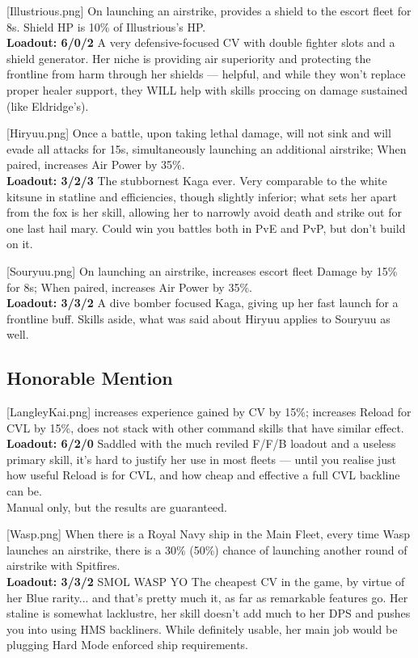 [Illustrious.png]
{On launching an airstrike, provides a shield to the escort fleet for 8s. Shield HP is 10\% of Illustrious's HP.\\
\textbf{Loadout: 6/0/2}}
{}
{A very defensive-focused CV with double fighter slots and a shield generator. Her niche is providing air superiority and protecting the frontline from harm through her shields --- helpful, and while they won't replace proper healer support, they WILL help with skills proccing on damage sustained (like Eldridge's).}
 
[Hiryuu.png]
{Once a battle, upon taking lethal damage, will not sink and will evade all attacks for 15s, simultaneously launching an additional airstrike; When paired, increases Air Power by 35\%.\\
\textbf{Loadout: 3/2/3}}
{}
{The stubbornest Kaga ever. Very comparable to the white kitsune in statline and efficiencies, though slightly inferior; what sets her apart from the fox is her skill, allowing her to narrowly avoid death and strike out for one last hail mary. Could win you battles both in PvE and PvP, but don't build on it.}

[Souryuu.png]
{On launching an airstrike, increases escort fleet Damage by 15\% for 8s; When paired, increases Air Power by 35\%.\\
\textbf{Loadout: 3/3/2}}
{}
{A dive bomber focused Kaga, giving up her fast launch for a frontline buff. Skills aside, what was said about Hiryuu applies to Souryuu as well.}


\newpage
\subsection{Honorable Mention}
[LangleyKai.png]
{increases experience gained by CV by 15\%; increases Reload for CVL by 15\%, does not stack with other command skills that have similar effect. \\
\textbf{Loadout: 6/2/0}}
{}
{Saddled with the much reviled F/F/B loadout and a useless primary skill, it's hard to justify her use in most fleets --- until you realise just how useful Reload is for CVL, and how cheap and effective a full CVL backline can be.\\
Manual only, but the results are guaranteed.}

[Wasp.png]
{When there is a Royal Navy ship in the Main Fleet, every time Wasp launches an airstrike, there is a 30\% (50\%) chance of launching another round of airstrike with Spitfires.\\
\textbf{Loadout: 3/3/2}}
{SMOL WASP YO}
{The cheapest CV in the game, by virtue of her Blue rarity... and that's pretty much it, as far as remarkable features go. Her staline is somewhat lacklustre, her skill doesn't add much to her DPS and pushes you into using HMS backliners. While definitely usable, her main job would be plugging Hard Mode enforced ship requirements.}



